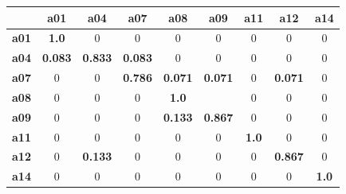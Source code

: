 \documentclass[review]{elsarticle}
\begin{document}
\begin{table}[H]
\begin{center}
{\begin{tabular}{c|cccccccc}
			               &      {\bf a01} &      {\bf a04} &      {\bf a07} &      {\bf a08} &      {\bf a09} &      {\bf a11} &      {\bf a12} &      {\bf a14} \\
			\hline
			     {\bf a01} &     {\bf 1.0 } &              0 &              0 &              0 &              0 &              0 &              0 &              0 \\
			
			     {\bf a04} &   {\bf 0.083 } &   {\bf 0.833 } &   {\bf 0.083 } &              0 &              0 &              0 &              0 &              0 \\
			
			     {\bf a07} &              0 &              0 &   {\bf 0.786 } &   {\bf 0.071 } &   {\bf 0.071 } &              0 &   {\bf 0.071 } &              0 \\
			
			     {\bf a08} &              0 &              0 &              0 &     {\bf 1.0 } &                &              0 &              0 &              0 \\
			
			     {\bf a09} &              0 &              0 &              0 &   {\bf 0.133 } &   {\bf 0.867 } &              0 &              0 &              0 \\
			
			     {\bf a11} &              0 &              0 &              0 &              0 &              0 &     {\bf 1.0 } &              0 &              0 \\
			
			     {\bf a12} &              0 &   {\bf 0.133 } &              0 &              0 &              0 &              0 &   {\bf 0.867 } &              0 \\
			
			     {\bf a14} &              0 &              0 &              0 &              0 &              0 &              0 &              0 &     {\bf 1.0 } \\
			
			\end{tabular}
		}
		
\end{center}
\end{table}
\end{document}
